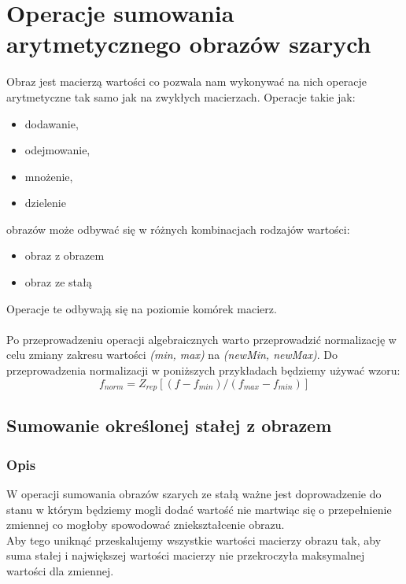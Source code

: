 \documentclass[a4paper,12pt]{book}
\begin{document}
\chapter{Operacje sumowania arytmetycznego obrazów szarych}
Obraz jest macierzą wartości co pozwala nam wykonywać na nich operacje arytmetyczne tak samo jak na zwykłych macierzach. 
Operacje takie jak: 
\renewcommand{\labelitemi}{$*$}
\begin{itemize}
	\item dodawanie,
	\item odejmowanie,
	\item mnożenie,
	\item dzielenie
\end{itemize}
obrazów może odbywać się w różnych kombinacjach rodzajów wartości: 
\renewcommand{\labelitemi}{$*$}
\begin{itemize}
	\item obraz z obrazem
	\item obraz ze stałą
\end{itemize}
Operacje te odbywają się na poziomie komórek macierz. 
\\\\
Po przeprowadzeniu operacji algebraicznych warto przeprowadzić normalizację w celu zmiany zakresu wartości \textit{(min, max)} na \textit{(newMin, newMax)}. 
Do przeprowadzenia normalizacji w poniższych przykładach będziemy używać wzoru: 
\[f_{norm}=Z_{rep}[(f-f_{min})/(f_{max}-f_{min})]\]

\section{Sumowanie określonej stałej z obrazem}
\subsection{Opis}
W operacji sumowania obrazów szarych ze stałą ważne jest doprowadzenie do stanu w którym będziemy mogli dodać wartość 
nie martwiąc się o przepełnienie zmiennej co mogłoby spowodować zniekształcenie obrazu. \\
Aby tego uniknąć przeskalujemy wszystkie wartości macierzy obrazu tak, aby suma stałej i największej wartości macierzy 
nie przekroczyła maksymalnej wartości dla zmiennej. 
\end{document}
